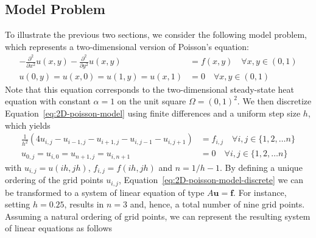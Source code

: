 \subsection{Model Problem}
To illustrate the previous two sections, we consider the following model problem, which represents a two-dimensional version of Poisson's equation:
\begin{equation}
	\begin{split}
		-\frac{\partial^2}{\partial x^2} u(x,y) - \frac{\partial^2}{\partial y^2} u(x,y) & = f(x, y) \quad \forall x, y \in (0, 1) \\
		u(0, y) = u(x, 0) = u(1, y) = u(x, 1) & = 0 \quad \forall x, y \in (0, 1)
	\end{split}
	\label{eq:2D-poisson-model}
\end{equation}
Note that this equation corresponds to the two-dimensional steady-state heat equation with constant $\alpha = 1$ on the unit square $\Omega = ( 0, 1 )^2$.
We then discretize Equation~\eqref{eq:2D-poisson-model} using finite differences and a uniform step size $h$, which yields
\begin{equation}
	\begin{split}
		\frac{1}{h^2} (4 u_{i,j} - u_{i-1, j} - u_{i+1, j} - u_{i, j-1} - u_{i, j+1}) & = f_{i, j} \quad \forall i, j \in \{1, 2, \dots n\} \\
		u_{0, j} = u_{i, 0} = u_{n+1, j} = u_{i, n+1} & = 0 \quad \forall i, j \in \{1, 2, \dots n\}
	\end{split} 
	\label{eq:2D-poisson-model-discrete}
\end{equation}
with $u_{i,j} = u(ih, jh)$, $f_{i,j} = f(ih, jh)$ and $n = 1/h - 1$.
By defining a unique ordering of the grid points $u_{i, j}$, Equation~\eqref{eq:2D-poisson-model-discrete} we can be transformed to a system of linear equation of type $A \bm{u} = \bm{f}$. 
For instance, setting $h = 0.25$, results in $n = 3$ and, hence, a total number of nine grid points.
Assuming a natural ordering of grid points, we can represent the resulting system of linear equations as follows

